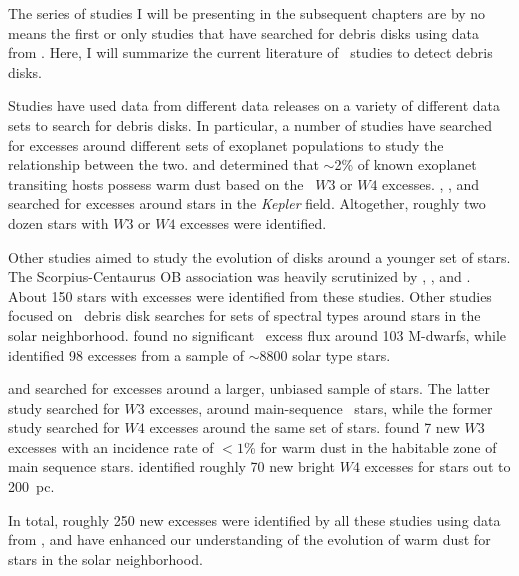     The series of studies I will be presenting in the subsequent chapters are by no means the first or only studies that have searched for debris disks using data from \WS. Here, I will summarize the current literature of \WS\ studies to detect debris disks.
    
    Studies have used data from different data releases on a variety of different data sets to search for debris disks. In particular, a number of studies have searched for excesses around different sets of exoplanet populations to study the relationship between the two. \citet{Krivov2011} and \citet{Morales2012} determined that $\sim$2\% of known exoplanet transiting hosts possess warm dust based on the \WS\ $W3$ or $W4$ excesses. \citet{Kennedy2012}, \citet{Ribas2012}, and \citet{Lawler2012} searched for excesses around stars in the \textit{Kepler} field. Altogether, roughly two dozen stars with $W3$ or $W4$ excesses were identified. 
    
    Other studies aimed to study the evolution of disks around a younger set of stars. The Scorpius-Centaurus OB association was heavily scrutinized by \citet{Rizzuto2012}, \citet{Luhman2012}, and \citet{Riaz2012}. About 150 stars with excesses were identified from these studies. Other studies focused on \WS\ debris disk searches for sets of spectral types around stars in the solar neighborhood. \citet{Avenhaus2012} found no significant \WS\ excess flux around 103 M-dwarfs, while \citet{Vican2014} identified 98 excesses from a sample of $\sim$8800 solar type stars. 
    
    \citet{Wu2013} and \citet{Kennedy2013} searched for excesses around a larger, unbiased sample of stars. The latter study searched for $W3$ excesses, around main-sequence \hip\ stars, while the former study searched for $W4$ excesses around the same set of stars. \citet{Kenned2013} found 7 new $W3$ excesses with an incidence rate of $<1$\% for warm dust in the habitable zone of main sequence stars. \citet{Wu2013} identified roughly 70 new bright $W4$ excesses for stars out to 200~pc. 
    
    In total, roughly 250 new excesses were identified by all these studies using data from \WS, and have enhanced our understanding of the evolution of warm dust for stars in the solar neighborhood. 
